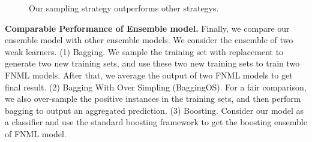 \documentclass[conference]{IEEEtran}
\begin{document}
\begin{figure}[t]
\centering
{}
\vspace*{-10pt}
\caption{Our sampling strategy outperforms other strategys.}\label{fig:samplingstrategy}
\end{figure}

\textbf{Comparable Performance of Ensemble model.} 
Finally, we compare our ensemble model with other ensemble models. We consider the ensemble of two weak learners. (1) Bagging. We sample the training set with replacement to generate two new training sets, and use these two new training sets to train two FNML models. After that, we average the output of two FNML models to get final result. (2) Bagging With Over Simpling (BaggingOS). For a fair comparison, we also over-sample the positive instances in the training sets, and then perform bagging to output an aggregated prediction. (3) Boosting. Consider our model as a classifier and use the standard boosting framework to get the boosting ensemble of FNML model. 
\end{document}
